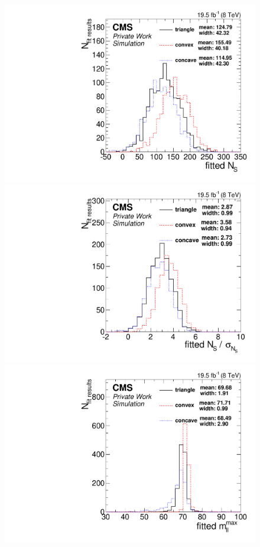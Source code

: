 \begin{figure}[b]
  \centering
  \begin{minipage}[t]{0.49\textwidth}
    \includegraphics[width=\textwidth]{plots/results/fit/toyResults/nSPure_shapeBias.pdf}
  \end{minipage}
  \begin{minipage}[t]{0.49\textwidth}
    \includegraphics[width=\textwidth]{plots/results/fit/toyResults/nS_shapeBias.pdf}
  \end{minipage}
  \begin{minipage}[t]{0.49\textwidth}
    \includegraphics[width=\textwidth]{plots/results/fit/toyResults/m0_shapeBias.pdf}

\end{minipage}
\end{figure}
